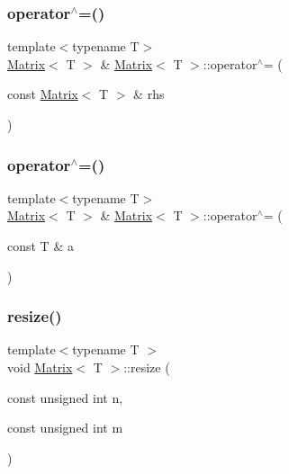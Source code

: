 \mbox{\label{classMatrix_acf14abe2000a4a41dae10db14b5d039c}} 
\subsubsection{\texorpdfstring{operator$^\wedge$=()}{operator^=()}\hspace{0.1cm}{\footnotesize\ttfamily [1/2]}}
{\footnotesize\ttfamily template$<$typename T$>$ \\
\mbox{\hyperlink{classMatrix}{Matrix}}$<$ T $>$ \& \mbox{\hyperlink{classMatrix}{Matrix}}$<$ T $>$\+::operator$^\wedge$= (\begin{DoxyParamCaption}\item[{const \mbox{\hyperlink{classMatrix}{Matrix}}$<$ T $>$ \&}]{rhs }\end{DoxyParamCaption})\hspace{0.3cm}{\ttfamily [inline]}}

\mbox{\label{classMatrix_af35faeb39342bf42c4470cf10630e32f}} 
\subsubsection{\texorpdfstring{operator$^\wedge$=()}{operator^=()}\hspace{0.1cm}{\footnotesize\ttfamily [2/2]}}
{\footnotesize\ttfamily template$<$typename T$>$ \\
\mbox{\hyperlink{classMatrix}{Matrix}}$<$ T $>$ \& \mbox{\hyperlink{classMatrix}{Matrix}}$<$ T $>$\+::operator$^\wedge$= (\begin{DoxyParamCaption}\item[{const T \&}]{a }\end{DoxyParamCaption})\hspace{0.3cm}{\ttfamily [inline]}}

\mbox{\label{classMatrix_a8d10454cfe9427269b54a754262004b8}} 
\subsubsection{\texorpdfstring{resize()}{resize()}\hspace{0.1cm}{\footnotesize\ttfamily [1/2]}}
{\footnotesize\ttfamily template$<$typename T $>$ \\
void \mbox{\hyperlink{classMatrix}{Matrix}}$<$ T $>$\+::resize (\begin{DoxyParamCaption}\item[{const unsigned int}]{n,  }\item[{const unsigned int}]{m }\end{DoxyParamCaption})\hspace{0.3cm}{\ttfamily [inline]}}

